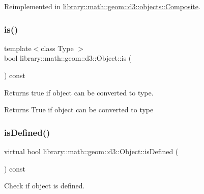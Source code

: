 Reimplemented in \hyperlink{classlibrary_1_1math_1_1geom_1_1d3_1_1objects_1_1_composite_abd37bc6f0b9132cee832d1628b76269c}{library\+::math\+::geom\+::d3\+::objects\+::\+Composite}.

\mbox{\label{classlibrary_1_1math_1_1geom_1_1d3_1_1_object_a72d75450e5158f602f0847f082606603}} 
\subsubsection{\texorpdfstring{is()}{is()}}
{\footnotesize\ttfamily template$<$class Type $>$ \\
bool library\+::math\+::geom\+::d3\+::\+Object\+::is (\begin{DoxyParamCaption}{ }\end{DoxyParamCaption}) const\hspace{0.3cm}{\ttfamily [inline]}}



Returns true if object can be converted to type. 

\begin{DoxyReturn}{Returns}
True if object can be converted to type 
\end{DoxyReturn}
\mbox{\label{classlibrary_1_1math_1_1geom_1_1d3_1_1_object_a2216442e322f0c3ca5f01a4efa22baf7}} 
\subsubsection{\texorpdfstring{is\+Defined()}{isDefined()}}
{\footnotesize\ttfamily virtual bool library\+::math\+::geom\+::d3\+::\+Object\+::is\+Defined (\begin{DoxyParamCaption}{ }\end{DoxyParamCaption}) const\hspace{0.3cm}{\ttfamily [pure virtual]}}



Check if object is defined. 

